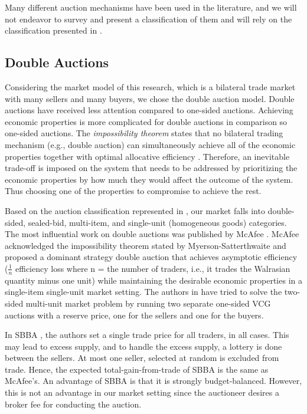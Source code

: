 Many different auction mechanisms have been used in the literature, and we will not endeavor to survey and present a classification of them and will rely on the classification presented in \cite{6365159}.

\subsection{Double Auctions}
Considering the market model of this research, which is a bilateral trade market with many sellers and many buyers, we chose the double auction model. Double auctions have received less attention compared to one-sided auctions. Achieving economic properties is more complicated for double auctions in comparison so one-sided auctions. The \textit{impossibility theorem} states that no bilateral trading mechanism (e.g., double auction) can simultaneously achieve all of the economic properties together with optimal allocative efficiency \cite{6214017}. Therefore, an inevitable trade-off is imposed on the system that needs to be addressed by prioritizing the economic properties by how much they would affect the outcome of the system. Thus choosing one of the properties to compromise to achieve the rest.


Based on the auction classification represented in \cite{6365159}, our market falls into double-sided, sealed-bid, multi-item, and single-unit (homogeneous goods) categories. The most influential work on double auctions was published by McAfee \cite{MCAFEE1992434}. McAfee acknowledged the impossibility theorem stated by Myerson-Satterthwaite \cite{MYERSON1983265} and proposed a dominant strategy double auction that achieves asymptotic efficiency ($\frac{1}{n}$ efficiency loss where n = the number of traders, i.e., it trades the Walrasian quantity minus one unit) while maintaining the desirable economic properties in a single-item single-unit market setting. The authors in \cite{Loertscher14amulti-unit} have tried to solve the two-sided multi-unit market problem by running two separate one-sided \ac{VCG} auctions with a reserve price, one for the sellers and one for the buyers.


In SBBA \cite{SBBA}, the authors set a single trade price for all traders, in all cases. This may lead to excess supply, and to handle the excess supply, a lottery is done between the sellers. At most one seller, selected at random is excluded from trade. Hence, the expected total-gain-from-trade of SBBA is the same as McAfee's. An advantage of SBBA is that it is strongly budget-balanced. However, this is not an advantage in our market setting since the auctioneer desires a broker fee for conducting the auction.

